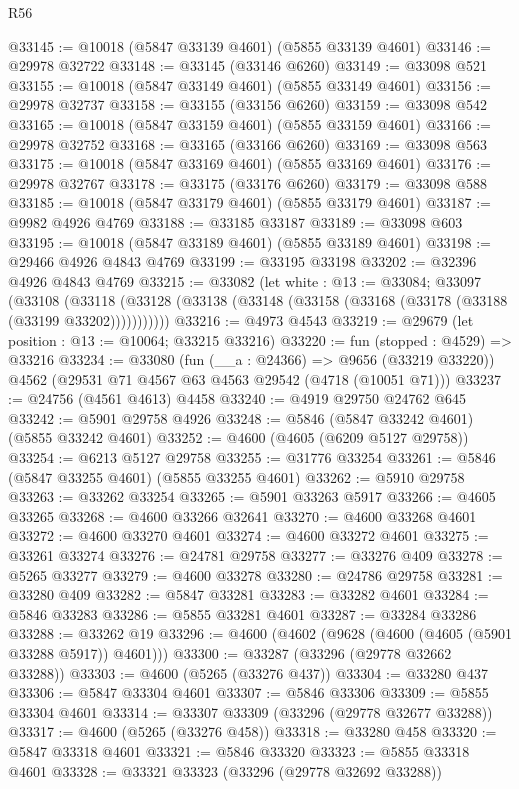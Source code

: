 \begin{lexlean}{R56}
\begin{coremodule}
@33145 := @10018 (@5847 @33139 @4601) (@5855 @33139 @4601)
@33146 := @29978 @32722
@33148 := @33145 (@33146 @6260)
@33149 := @33098 @521
@33155 := @10018 (@5847 @33149 @4601) (@5855 @33149 @4601)
@33156 := @29978 @32737
@33158 := @33155 (@33156 @6260)
@33159 := @33098 @542
@33165 := @10018 (@5847 @33159 @4601) (@5855 @33159 @4601)
@33166 := @29978 @32752
@33168 := @33165 (@33166 @6260)
@33169 := @33098 @563
@33175 := @10018 (@5847 @33169 @4601) (@5855 @33169 @4601)
@33176 := @29978 @32767
@33178 := @33175 (@33176 @6260)
@33179 := @33098 @588
@33185 := @10018 (@5847 @33179 @4601) (@5855 @33179 @4601)
@33187 := @9982 @4926 @4769
@33188 := @33185 @33187
@33189 := @33098 @603
@33195 := @10018 (@5847 @33189 @4601) (@5855 @33189 @4601)
@33198 := @29466 @4926 @4843 @4769
@33199 := @33195 @33198
@33202 := @32396 @4926 @4843 @4769
@33215 := @33082
    (let white : @13 := @33084;
    @33097
      (@33108
        (@33118 (@33128 (@33138 (@33148 (@33158 (@33168 (@33178 (@33188 (@33199 @33202)))))))))))
@33216 := @4973 @4543
@33219 := @29679 (let position : @13 := @10064; @33215 @33216)
@33220 := fun (stopped : @4529) => @33216
@33234 := @33080
    (fun (__a : @24366) => @9656 (@33219 @33220))
    @4562
    (@29531 @71 @4567 @63 @4563 @29542 (@4718 (@10051 @71)))
@33237 := @24756 (@4561 @4613) @4458
@33240 := @4919 @29750 @24762 @645
@33242 := @5901 @29758 @4926
@33248 := @5846 (@5847 @33242 @4601) (@5855 @33242 @4601)
@33252 := @4600 (@4605 (@6209 @5127 @29758))
@33254 := @6213 @5127 @29758
@33255 := @31776 @33254
@33261 := @5846 (@5847 @33255 @4601) (@5855 @33255 @4601)
@33262 := @5910 @29758
@33263 := @33262 @33254
@33265 := @5901 @33263 @5917
@33266 := @4605 @33265
@33268 := @4600 @33266 @32641
@33270 := @4600 @33268 @4601
@33272 := @4600 @33270 @4601
@33274 := @4600 @33272 @4601
@33275 := @33261 @33274
@33276 := @24781 @29758
@33277 := @33276 @409
@33278 := @5265 @33277
@33279 := @4600 @33278
@33280 := @24786 @29758
@33281 := @33280 @409
@33282 := @5847 @33281
@33283 := @33282 @4601
@33284 := @5846 @33283
@33286 := @5855 @33281 @4601
@33287 := @33284 @33286
@33288 := @33262 @19
@33296 := @4600 (@4602 (@9628 (@4600 (@4605 (@5901 @33288 @5917)) @4601)))
@33300 := @33287 (@33296 (@29778 @32662 @33288))
@33303 := @4600 (@5265 (@33276 @437))
@33304 := @33280 @437
@33306 := @5847 @33304 @4601
@33307 := @5846 @33306
@33309 := @5855 @33304 @4601
@33314 := @33307 @33309 (@33296 (@29778 @32677 @33288))
@33317 := @4600 (@5265 (@33276 @458))
@33318 := @33280 @458
@33320 := @5847 @33318 @4601
@33321 := @5846 @33320
@33323 := @5855 @33318 @4601
@33328 := @33321 @33323 (@33296 (@29778 @32692 @33288))

\end{coremodule}
\end{lexlean}
